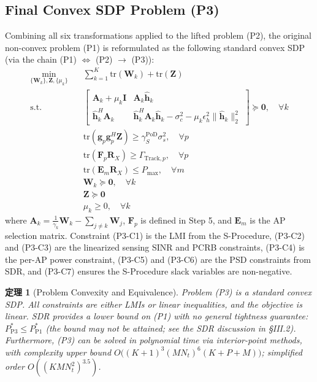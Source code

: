 \documentclass[12pt,a4paper]{article}
\newtheorem{theorem}{定理}
\newcommand{\vect}[1]{\mathbf{#1}}
\newcommand{\mat}[1]{\mathbf{#1}}
\newcommand{\norm}[1]{\|#1\|_2}
\newcommand{\tr}{\text{tr}}
\begin{document}
\subsection{Final Convex SDP Problem (P3)}

Combining all six transformations applied to the lifted problem (P2), the original non-convex problem (P1) is reformulated as the following standard convex SDP (via the chain (P1) $\Leftrightarrow$ (P2) $\to$ (P3)):
\begin{align}
\min_{\{\mat{W}_k\}, \mat{Z}, \{\mu_k\}} \quad 
& \sum_{k=1}^K \tr(\mat{W}_k) + \tr(\mat{Z}) \tag{P3} \\
\text{s.t.} \quad 
& \begin{bmatrix} \mat{A}_k + \mu_k \mat{I} & \mat{A}_k \hat{\vect{h}}_k \\[1.2ex] \hat{\vect{h}}_k^H \mat{A}_k & \hat{\vect{h}}_k^H \mat{A}_k \hat{\vect{h}}_k - \sigma_c^2 - \mu_k \epsilon_h^2 \norm{\hat{\vect{h}}_k}^2 \end{bmatrix} \succeq \mat{0}, \quad \forall k \tag{P3-C1} \label{eq:p3c1} \\
& \tr(\vect{g}_p \vect{g}_p^H \mat{Z}) \geq \gamma_S^{\text{PoD}} \sigma_s^2, \quad \forall p \tag{P3-C2} \label{eq:p3c2} \\
& \tr(\mat{F}_p \mat{R}_X) \geq \Gamma_{\text{Track},p}, \quad \forall p \tag{P3-C3} \label{eq:p3c3} \\
& \tr(\mat{E}_m \mat{R}_X) \leq P_{\max}, \quad \forall m \tag{P3-C4} \label{eq:p3c4} \\
& \mat{W}_k \succeq \mat{0}, \quad \forall k \tag{P3-C5} \label{eq:p3c5} \\
& \mat{Z} \succeq \mat{0} \tag{P3-C6} \label{eq:p3c6} \\
& \mu_k \geq 0, \quad \forall k \tag{P3-C7} \label{eq:p3c7}
\end{align}
where $\mat{A}_k = \frac{1}{\gamma_k} \mat{W}_k - \sum_{j \neq k} \mat{W}_j$, $\mat{F}_p$ is defined in Step 5, and $\mat{E}_m$ is the AP selection matrix. Constraint (P3-C1) is the LMI from the S-Procedure, (P3-C2) and (P3-C3) are the linearized sensing SINR and PCRB constraints, (P3-C4) is the per-AP power constraint, (P3-C5) and (P3-C6) are the PSD constraints from SDR, and (P3-C7) ensures the S-Procedure slack variables are non-negative.

\begin{theorem}[Problem Convexity and Equivalence]\label{thm:main}
Problem (P3) is a standard convex SDP. All constraints are either LMIs or linear inequalities, and the objective is linear. SDR provides a lower bound on (P1) with no general tightness guarantee: $P_{\text{P3}}^* \leq P_{\text{P1}}^*$ (the bound may not be attained; see the SDR discussion in §III.2). Furthermore, (P3) can be solved in polynomial time via interior-point methods, with complexity upper bound $O\!\big((K+1)^3 (MN_t)^6 (K+P+M)\big)$; simplified order $O((K M N_t^2)^{3.5})$.
\end{theorem}
\end{document}
